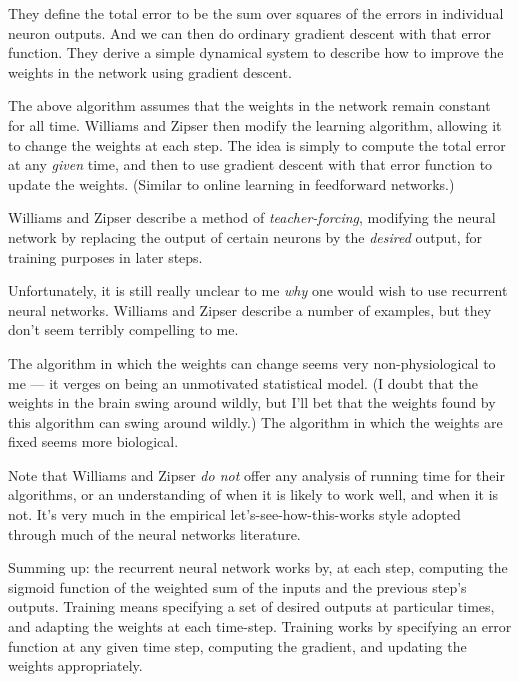 \documentclass[12pt]{article}
\begin{document}
  They define the total error to be the sum over squares of the errors
  in individual neuron outputs.  And we can then do ordinary gradient
  descent with that error function.  They derive a simple dynamical
  system to describe how to improve the weights in the network using
  gradient descent.

  The above algorithm assumes that the weights in the network remain
  constant for all time.  Williams and Zipser then modify the learning
  algorithm, allowing it to change the weights at each step.  The idea
  is simply to compute the total error at any \emph{given} time, and then
  to use gradient descent with that error function to update the
  weights.  (Similar to online learning in feedforward networks.)
  
  Williams and Zipser describe a method of \emph{teacher-forcing},
  modifying the neural network by replacing the output of certain
  neurons by the \emph{desired} output, for training purposes in later
  steps.
  
  Unfortunately, it is still really unclear to me \emph{why} one would
  wish to use recurrent neural networks.  Williams and Zipser describe
  a number of examples, but they don't seem terribly compelling to me.
  
  The algorithm in which the weights can change seems very
  non-physiological to me --- it verges on being an unmotivated
  statistical model.  (I doubt that the weights in the brain swing
  around wildly, but I'll bet that the weights found by this algorithm
  can swing around wildly.)  The algorithm in which the weights are
  fixed seems more biological.
  
  Note that Williams and Zipser \emph{do not} offer any analysis of
  running time for their algorithms, or an understanding of when it is
  likely to work well, and when it is not.  It's very much in the
  empirical let's-see-how-this-works style adopted through much of the
  neural networks literature.
  
  Summing up: the recurrent neural network works by, at each step,
  computing the sigmoid function of the weighted sum of the inputs and
  the previous step's outputs.  Training means specifying a set of
  desired outputs at particular times, and adapting the weights at
  each time-step.  Training works by specifying an error function at
  any given time step, computing the gradient, and updating the
  weights appropriately.
\end{document}
